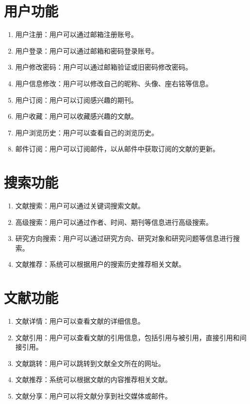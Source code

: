 \documentclass[UTF8,openany]{ctexbook}
\begin{document}
\section{用户功能}

\begin{enumerate}
    \item 用户注册：用户可以通过邮箱注册账号。
    \item 用户登录：用户可以通过邮箱和密码登录账号。
    \item 用户修改密码：用户可以通过邮箱验证或旧密码修改密码。
    \item 用户信息修改：用户可以修改自己的昵称、头像、座右铭等信息。
    \item 用户订阅：用户可以订阅感兴趣的期刊。
    \item 用户收藏：用户可以收藏感兴趣的文献。
    \item 用户浏览历史：用户可以查看自己的浏览历史。
    \item 邮件订阅：用户可以订阅邮件，以从邮件中获取订阅的文献的更新。
\end{enumerate}

\section{搜索功能}

\begin{enumerate}
    \item 文献搜索：用户可以通过关键词搜索文献。
    \item 高级搜索：用户可以通过作者、时间、期刊等信息进行高级搜索。
    \item 研究方向搜索：用户可以通过研究方向、研究对象和研究问题等信息进行搜索。
    \item 文献推荐：系统可以根据用户的搜索历史推荐相关文献。
\end{enumerate}

\section{文献功能}

\begin{enumerate}
    \item 文献详情：用户可以查看文献的详细信息。
    \item 文献引用：用户可以查看文献的引用信息，包括引用与被引用，直接引用和间接引用。
    \item 文献跳转：用户可以跳转到文献全文所在的网址。
    \item 文献推荐：系统可以根据文献的内容推荐相关文献。
    \item 文献分享：用户可以将文献分享到社交媒体或邮件。
\end{enumerate}
\end{document}
